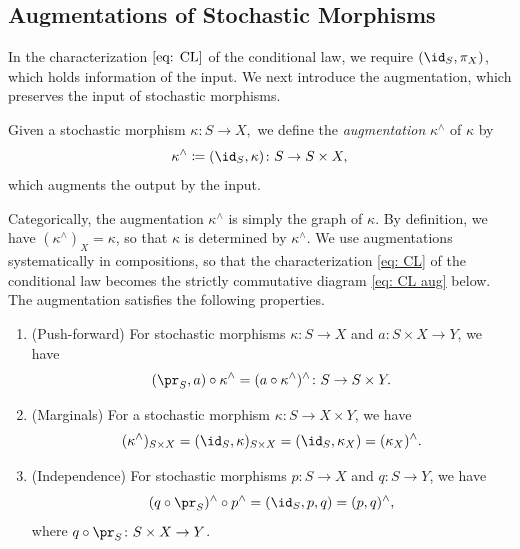\documentclass[12pt,reqno]{amsart}%
\theoremstyle{plain}
\theoremstyle{definition}
\begin{document}
\subsection{Augmentations of Stochastic Morphisms}

In the characterization $\eqref{eq: CL}$ of the conditional law,
we require $(\id_S, \pi_X)$, which holds
information of the input.  We next introduce the augmentation,
which preserves the input of stochastic morphisms.

\begin{definition}
	Given a stochastic morphism
	$
		\kappa\colon S\rightarrow X,
	$
	we define the \emph{augmentation} $\kappa^\wedge$ of $\kappa$ by
	\[
		\kappa^\wedge\coloneqq(\id_S,\kappa)\colon S\rightarrow S\times X,
	\]
	which augments the output by the input.
\end{definition}
Categorically, the augmentation $\kappa^\wedge$ is simply the graph of $\kappa$.
By definition, we have $(\kappa^\wedge)_X=\kappa$, so that $\kappa$ is determined by $\kappa^\wedge$.
We use augmentations systematically in compositions, so that the characterization
\eqref{eq: CL} of the conditional law becomes the strictly commutative diagram
\eqref{eq: CL aug} below.
The augmentation satisfies the following properties.

\begin{lemma}\label{lem: augmentations}
	\begin{enumerate}[label=(\alph*)]
		\item\label{aug: P} (Push-forward)
		For stochastic morphisms $\kappa\colon S\rightarrow X$ and $a\colon S\times X\rightarrow Y$, we have
		\[
			(\pr_S,a)\circ\kappa^\wedge=(a\circ\kappa^\wedge)^\wedge\colon S\rightarrow S\times Y.
		\]
	\item\label{aug: M} (Marginals)
	For a stochastic morphism $\kappa\colon S\rightarrow X\times Y$, we have
	\[
		(\kappa^\wedge)_{S\times X}=(\id_S,\kappa)_{S\times X}=(\id_S,\kappa_X)=(\kappa_X)^\wedge.
	\]
	\item\label{aug: I} (Independence)
	For stochastic morphisms $p\colon S\rightarrow X$ and $q\colon S\rightarrow Y$, we have
	\[
		(q\circ\pr_S)^\wedge\circ p^\wedge=(\id_S,p,q)=(p,q)^\wedge,
	\]
	where $q\circ\pr_S\colon S\times X\rightarrow Y$.
	\end{enumerate}
\end{lemma}
\end{document}
